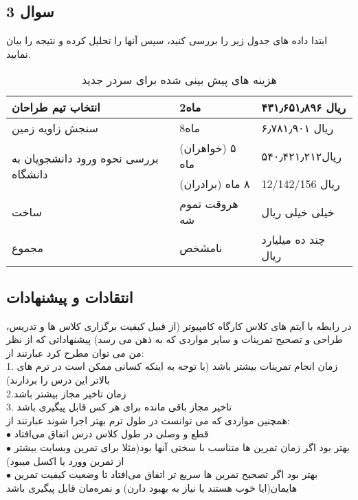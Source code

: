 \documentclass[twoside]{article}
\newcommand{\نام}{هیراد داوری}
\newcommand{\گروه}{4}
\begin{document}
\subsection*{سوال 3}
ابتدا داده های جدول زیر را بررسی کنید، سپس آنها را تحلیل کرده و نتیجه را بیان نمایید.

\begin{table}[h]
\centering
\begin{tabular}{|l|l|l|}
\hline
        {انتخاب تیم طراحان}       & {2ماه} & {۴۳۱٫۶۵۱٫۸۹۶ ریال}  \\ \hline
          {سنجش زاویه زمین}       & {8ماه} &{۶٫۷۸۱٫۹۰۱ ریال}  \\ \hline
\multirow{2}{*}{بررسی نحوه ورود دانشجویان به دانشگاه} & (خواهران) ۵ ماه & ۵۴۰٫۴۲۱٫۲۱۲ریال \\ \cline{2-3} 
                   & (برادران) ۸ ماه & {12/142/156 ریال} \\ \hline
{ساخت}                  & {هروقت تموم شه} & {خیلی خیلی ریال} \\ \hline
{مجموع}                 & { نامشخص}& {چند ده میلیارد ریال} \\ \hline
\end{tabular}
\caption{هزینه های پیش بینی شده برای سردر جدید}
\label{tab:my-table}
\end{table}
\subsection*{انتقادات و پیشنهادات}
در رابطه با آیتم های کلاس کارگاه کامپیوتر (از قبیل کیفیت برگزاری کلاس ها و تدریس، طراحی و تصحیح تمرینات و سایر مواردی
که به ذهن می رسد) پیشنهاداتی که از نظر من می توان مطرح کرد  عبارتند از:
\\
1. زمان انجام تمرینات بیشتر باشد (با توجه به اینکه کسانی ممکن است در ترم های بالاتر این درس را بردارند)\\
2.زمان تاخیر مجاز بیشتر باشد\\
3. تاخیر مجاز باقی مانده برای هر کس قابل پیگیری باشد \\
همچنین مواردی که می توانست در طول ترم بهتر اجرا شوند عبارتند از: 
\\
$\bullet$ قطع و وصلی در طول کلاس درس اتفاق می‌افتاد
\\
$\bullet$
بهتر بود اگر زمان تمرین ها متناسب با سختی آنها بود(مثلا برای تمرین وبسایت بیشتر از تمرین وورد یا اکسل میبود)
\\
$\bullet$
 بهتر بود اگر تصحیح تمرین ها سریع تر اتفاق می‌افتاد تا وضعیت کیفیت تمرین هایمان(ایا خوب هستند یا نیاز به بهبود دارن) و نمره‌مان قابل پیگیری باشد
\end{document}

